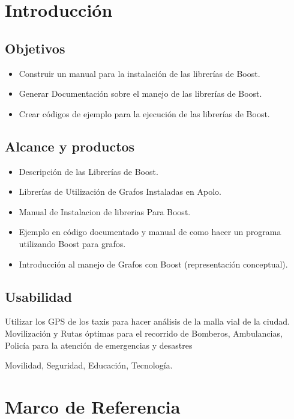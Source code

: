 \documentclass[twoside,letterpaper,12pt]{report}
\begin{document}
\newpage

\chapter{Introducción}

\section{Objetivos}

\begin{itemize}
	\item Construir un manual para la instalación de las librerías de Boost.
	\item Generar Documentación sobre el manejo de las librerías de Boost.
	\item Crear códigos de ejemplo para la ejecución de las librerías de Boost.
\end{itemize}



\section{Alcance y productos}

\begin{itemize}
	\item Descripción de las Librerías de Boost.
	\item Librerías de Utilización de Grafos Instaladas en Apolo.
	\item Manual de Instalacion de librerias Para Boost.
	\item Ejemplo en código documentado y manual de como hacer un programa utilizando Boost para grafos.
	\item Introducción al manejo de Grafos con Boost (representación conceptual).

\end{itemize}


\section{Usabilidad}

Utilizar los GPS de los taxis para hacer análisis de la malla vial de la ciudad. 
Movilización y Rutas óptimas para el recorrido de Bomberos, Ambulancias, Policía para la atención de emergencias y desastres

Movilidad, Seguridad, Educación, Tecnología.

\chapter{Marco de Referencia}
\label{ChapRef}
\end{document}
